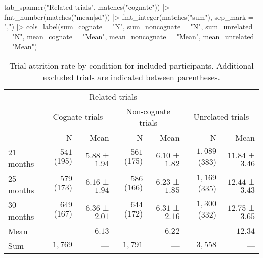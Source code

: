 \documentclass[
  letterpaper,
  DIV=11,
  numbers=noendperiod]{scrartcl}
\newenvironment{Shaded}{\begin{snugshade}}{\end{snugshade}}
\newcommand{\AttributeTok}[1]{\textcolor[rgb]{0.40,0.45,0.13}{#1}}
\newcommand{\FunctionTok}[1]{\textcolor[rgb]{0.28,0.35,0.67}{#1}}
\newcommand{\NormalTok}[1]{\textcolor[rgb]{0.00,0.23,0.31}{#1}}
\newcommand{\SpecialCharTok}[1]{\textcolor[rgb]{0.37,0.37,0.37}{#1}}
\newcommand{\StringTok}[1]{\textcolor[rgb]{0.13,0.47,0.30}{#1}}
\begin{document}
\begin{Shaded}
\begin{Highlighting}[]
    \FunctionTok{tab\_spanner}\NormalTok{(}\StringTok{"Related trials"}\NormalTok{, }\FunctionTok{matches}\NormalTok{(}\StringTok{"cognate"}\NormalTok{)) }\SpecialCharTok{|\textgreater{}}
    \FunctionTok{fmt\_number}\NormalTok{(}\FunctionTok{matches}\NormalTok{(}\StringTok{"mean|sd"}\NormalTok{)) }\SpecialCharTok{|\textgreater{}} 
    \FunctionTok{fmt\_integer}\NormalTok{(}\FunctionTok{matches}\NormalTok{(}\StringTok{"sum"}\NormalTok{), }\AttributeTok{sep\_mark =} \StringTok{","}\NormalTok{) }\SpecialCharTok{|\textgreater{}} 
    \FunctionTok{cols\_label}\NormalTok{(}\AttributeTok{sum\_cognate =} \StringTok{"N"}\NormalTok{,}
               \AttributeTok{sum\_noncognate =} \StringTok{"N"}\NormalTok{,}
               \AttributeTok{sum\_unrelated =} \StringTok{"N"}\NormalTok{,}
               \AttributeTok{mean\_cognate =} \StringTok{"Mean"}\NormalTok{,}
               \AttributeTok{mean\_noncognate =} \StringTok{"Mean"}\NormalTok{,}
               \AttributeTok{mean\_unrelated =} \StringTok{"Mean"}\NormalTok{)}
\end{Highlighting}
\end{Shaded}

\hypertarget{tbl-attrition-trials-noeach}{}
\begin{longtable}{l|rrrrrr}
\caption{\label{tbl-attrition-trials-noeach}Trial attrition rate by condition for included participants. Additional
excluded trials are indicated between parentheses. }\tabularnewline

\toprule
\multicolumn{1}{l}{} & \multicolumn{4}{c}{Related trials} &  &  \\ 
\cmidrule(lr){2-5}
\multicolumn{1}{l}{} & \multicolumn{2}{c}{Cognate trials} & \multicolumn{2}{c}{Non-cognate trials} & \multicolumn{2}{c}{Unrelated trials} \\ 
\cmidrule(lr){2-3} \cmidrule(lr){4-5} \cmidrule(lr){6-7}
\multicolumn{1}{l}{} & N & Mean & N & Mean & N & Mean \\ 
\midrule
21 months & $541$ (195) & $5.88$ ± $1.94$ & $561$ (175) & $6.10$ ± $1.82$ & $1,089$ (383) & $11.84$ ± $3.46$ \\ 
25 months & $579$ (173) & $6.16$ ± $1.94$ & $586$ (166) & $6.23$ ± $1.85$ & $1,169$ (335) & $12.44$ ± $3.43$ \\ 
30 months & $649$ (167) & $6.36$ ± $2.01$ & $644$ (172) & $6.31$ ± $2.16$ & $1,300$ (332) & $12.75$ ± $3.65$ \\ 
\midrule 
\midrule 
Mean & — & $6.13$ & — & $6.22$ & — & $12.34$ \\ 
Sum & $1,769$ & — & $1,791$ & — & $3,558$ & — \\ 
\bottomrule
\end{longtable}
\end{document}
